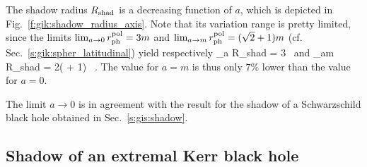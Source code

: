 The shadow radius
$R_{\rm shad}$ is a decreasing function of $a$, which is depicted in Fig.~\ref{f:gik:shadow_radius_axis}.
Note that its variation range is pretty limited, since the limits
$\lim_{a\to 0} r_{\rm ph}^{\rm pol} = 3 m$ and $\lim_{a\to m} r_{\rm ph}^{\rm pol} = (\sqrt{2} + 1) m$
(cf. Sec.~\ref{s:gik:spher_latitudinal})
yield respectively
\be \label{e:gik:R_shad_limits}
    \lim_{a} R_{\rm shad} = 3   \, 
    \quad\mbox{and}\quad
    \lim_{a\to m} R_{\rm shad} =  2( + 1) 
     \,   .
\ee
The value for $a= m$ is thus only $7\%$ lower than the value for $a= 0$.

\begin{remark}
The limit $a\to 0$ is in agreement with the result for the shadow of a
Schwarzschild black hole obtained in Sec.~\ref{s:gis:shadow}.
\end{remark}


\subsection{Shadow of an extremal Kerr black hole} \label{s:gik:shadow_extremal}

